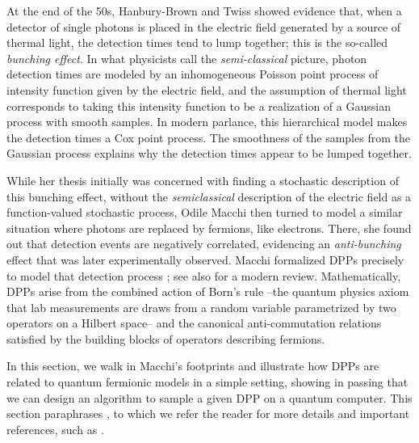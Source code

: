 At the end of the 50s, Hanbury-Brown and Twiss showed evidence that, when a detector of single photons is placed in the electric field generated by a source of thermal light, the detection times tend to lump together; this is the so-called \emph{bunching effect}.
In what physicists call the \emph{semi-classical} picture, photon detection times are modeled by an inhomogeneous Poisson point process of intensity function given by the electric field, and the assumption of thermal light corresponds to taking this intensity function to be a realization of a Gaussian process with smooth samples. 
In modern parlance, this hierarchical model makes the detection times a Cox point process. 
The smoothness of the samples from the Gaussian process explains why the detection times appear to be lumped together.

While her thesis initially was concerned with finding a stochastic description of this bunching effect, without the \emph{semiclassical} description of the electric field as a function-valued stochastic process, Odile Macchi then turned to model a similar situation where photons are replaced by fermions, like electrons. 
There, she found out that detection events are negatively correlated, evidencing an \emph{anti-bunching} effect that was later experimentally observed.
Macchi formalized DPPs precisely to model that detection process \cite{Mac72}; see also \cite{BFBDHRRSW22Sub} for a modern review. 
Mathematically, DPPs arise from the combined action of Born's rule --the quantum physics axiom that lab measurements are draws from a random variable parametrized by two operators on a Hilbert space-- and the canonical anti-commutation relations satisfied by the building blocks of operators describing fermions.

In this section, we walk in Macchi's footprints and illustrate how DPPs are related to quantum fermionic models in a simple setting, showing in passing that we can design an algorithm to sample a given DPP on a quantum computer.
This section paraphrases \cite{BaFaFe24}, to which we refer the reader for more details and important references, such as \cite{JSKSB18, KePr22}.

